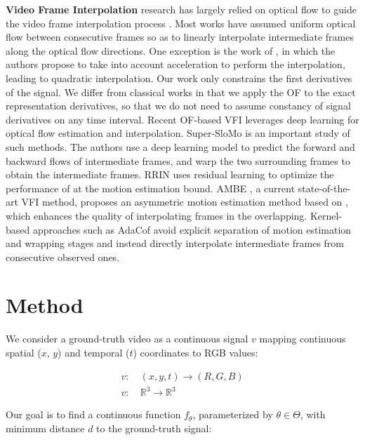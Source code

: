 \documentclass{article}
\begin{document}
\textbf{Video Frame Interpolation} research has largely relied on optical flow to guide the video frame interpolation process \cite{baker2011database} \cite{barron1994performance} \cite{herbst2009occlusion}.
Most works have assumed uniform optical flow between consecutive frames so as to linearly interpolate intermediate frames along the optical flow directions.
One exception is the work of \cite{xu2019quadratic}, in which the authors propose to take into account acceleration to perform the interpolation,
leading to quadratic interpolation.
Our work only constrains the first derivatives of the signal.
We differ from classical works in that we apply the OF to the exact representation derivatives,
so that we do not need to assume constancy of signal derivatives on any time interval.
Recent OF-based VFI leverages deep learning for optical flow estimation and interpolation.
Super-SloMo \cite{jiang2018super} is an important study of such methods.
The authors use a deep learning model to predict the forward and backward flows
of intermediate frames, and warp the two surrounding frames to obtain the intermediate frames.
RRIN \cite{li2020video} uses residual learning to optimize the performance of \cite{jiang2018super} at the motion estimation bound.
AMBE \cite{park2021asymmetric}, a current state-of-the-art VFI method,
proposes an asymmetric motion estimation method based on \cite{park2020bmbc},
which enhances the quality of interpolating frames in the overlapping.
Kernel-based approaches such as AdaCof \cite{lee2020adacof} avoid explicit separation of motion estimation and wrapping stages and
instead directly interpolate intermediate frames from consecutive observed ones.

\section{Method}
\label{sec_method}
We consider a ground-truth video as a continuous signal $v$ mapping continuous spatial ($x$, $y$) and temporal ($t$) coordinates to RGB values:

\begin{equation}
\begin{aligned}
v:& \: (x, y, t) \rightarrow (R, G, B) \\
v:& \: \mathbb{R}^3 \rightarrow \mathbb{R}^3
\end{aligned}
\end{equation}

Our goal is to find a continuous function $f_{\theta}$, parameterized by $\theta \in \Theta$,
with minimum distance $d$ to the ground-truth signal:
\end{document}
